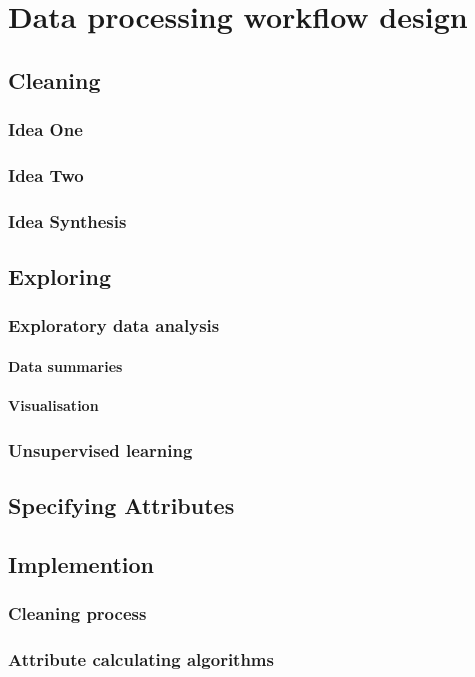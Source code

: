 \section{Data processing workflow design}
	\subsection{Cleaning}
		\subsubsection{Idea One}
		\subsubsection{Idea Two}
		\subsubsection{Idea Synthesis}
	\subsection{Exploring}
		\subsubsection{Exploratory data analysis}
			\paragraph{Data summaries}
			\paragraph{Visualisation}
		\subsubsection{Unsupervised learning}
	\subsection{Specifying Attributes}
	\subsection{Implemention}
		\subsubsection{Cleaning process}
		\subsubsection{Attribute calculating algorithms}		


